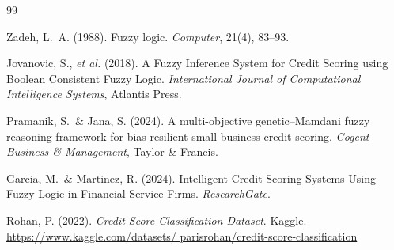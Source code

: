 \documentclass[12pt,a4paper]{report}
\begin{document}
\newpage
{}
\renewcommand{\bibname}{DAFTAR PUSTAKA}

\makeatletter
\renewcommand\@biblabel[1]{}
\makeatother

\begin{thebibliography}{99}
\setlength{\itemindent}{-2.5em}

Zadeh, L.~A. (1988). Fuzzy logic. \textit{Computer}, 21(4),
83--93.

Jovanovic, S., \textit{et al.} (2018). A Fuzzy Inference
System for Credit Scoring using Boolean Consistent Fuzzy
Logic. \textit{International Journal of Computational
Intelligence Systems}, Atlantis Press.

Pramanik, S.\ \& Jana, S. (2024). A multi-objective
genetic--Mamdani fuzzy reasoning framework for bias-resilient
small business credit scoring. \textit{Cogent Business \&
Management}, Taylor \& Francis.

Garcia, M.\ \& Martinez, R. (2024). Intelligent Credit
Scoring Systems Using Fuzzy Logic in Financial Service Firms.
\textit{ResearchGate}.

Rohan, P. (2022). \textit{Credit Score Classification
Dataset}. Kaggle. \url{https://www.kaggle.com/datasets/
parisrohan/credit-score-classification}

\end{thebibliography}
\end{document}
